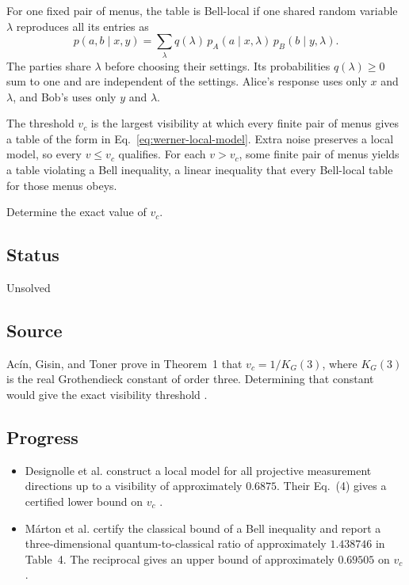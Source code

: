 For one fixed pair of menus, the table is Bell-local if one shared random variable $\lambda$ reproduces all its entries as
\begin{equation}
p(a,b\mid x,y)=\sum_{\lambda}q(\lambda)\,p_A(a\mid x,\lambda)\,p_B(b\mid y,\lambda).
\label{eq:werner-local-model}
\end{equation}
The parties share $\lambda$ before choosing their settings. Its probabilities $q(\lambda)\geq0$ sum to one and are independent of the settings. Alice's response uses only $x$ and $\lambda$, and Bob's uses only $y$ and $\lambda$.

The threshold $v_c$ is the largest visibility at which every finite pair of menus gives a table of the form in Eq.~\eqref{eq:werner-local-model}. Extra noise preserves a local model, so every $v\le v_c$ qualifies. For each $v>v_c$, some finite pair of menus yields a table violating a Bell inequality, a linear inequality that every Bell-local table for those menus obeys.

Determine the exact value of $v_c$.

\subsection*{Status}

Unsolved

\subsection*{Source}

Acín, Gisin, and Toner prove in Theorem~1 that $v_c=1/K_G(3)$, where $K_G(3)$ is the real Grothendieck constant of order three. Determining that constant would give the exact visibility threshold .

\subsection*{Progress}

\begin{itemize}
  \item Designolle et al. construct a local model for all projective measurement directions up to a visibility of approximately $0.6875$. Their Eq.~(4) gives a certified lower bound on $v_c$ .

  \item Márton et al. certify the classical bound of a Bell inequality and report a three-dimensional quantum-to-classical ratio of approximately $1.438746$ in Table~4. The reciprocal gives an upper bound of approximately $0.69505$ on $v_c$ .
\end{itemize}


